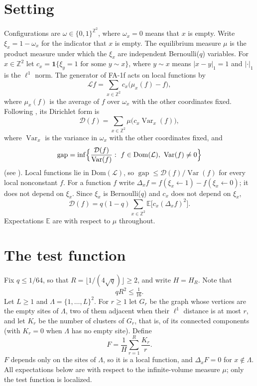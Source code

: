 \documentclass[11pt]{article}
\theoremstyle{remark}
\newcommand{\Z}{\mathbb Z}
\newcommand{\E}{\mathbb E}
\newcommand{\1}{\mathbf 1}
\DeclareMathOperator{\Var}{Var}
\DeclareMathOperator{\gap}{gap}
\begin{document}
\section{Setting}\label{sec:setting}

Configurations are $\omega\in\{0,1\}^{\Z^2}$, where $\omega_x=0$ means that $x$ is empty. Write $\xi_x=1-\omega_x$ for the indicator that $x$ is empty. The equilibrium measure $\mu$ is the product measure under which the $\xi_x$ are independent Bernoulli($q$) variables. For $x\in\Z^2$ let $c_x=\1\{\xi_y=1\text{ for some }y\sim x\}$, where $y\sim x$ means $|x-y|_1=1$ and $|\cdot|_1$ is the $\ell^1$ norm. The generator of FA-1f acts on local functions by
\[
\mathcal Lf=\sum_{x\in\Z^2}c_x\bigl(\mu_x(f)-f\bigr),
\]
where $\mu_x(f)$ is the average of $f$ over $\omega_x$ with the other coordinates fixed. Following \cite{CMRT,HT}, its Dirichlet form is
\[
\mathcal D(f)=\sum_{x\in\Z^2}\mu\bigl(c_x\Var_x(f)\bigr),
\]
where $\Var_x$ is the variance in $\omega_x$ with the other coordinates fixed, and
\[
\gap=\inf\Bigl\{\frac{\mathcal D(f)}{\Var(f)}:\ f\in\mathrm{Dom}(\mathcal L),\ \Var(f)\ne0\Bigr\}
\]
(see \cite[(2.8)]{CMRT}). Local functions lie in $\mathrm{Dom}(\mathcal L)$, so $\gap\le\mathcal D(f)/\Var(f)$ for every local nonconstant $f$.
For a function $f$ write $\Delta_xf=f(\xi_x\leftarrow1)-f(\xi_x\leftarrow0)$; it does not depend on $\xi_x$. Since $\xi_x$ is Bernoulli($q$) and $c_x$ does not depend on $\xi_x$,
\begin{equation}\label{eq:dirichlet}
\mathcal D(f)=q(1-q)\sum_{x\in\Z^2}\E\bigl[c_x(\Delta_xf)^2\bigr].
\end{equation}
Expectations $\E$ are with respect to $\mu$ throughout.

\section{The test function}

Fix $q\le1/64$, so that $R=\lfloor1/(4\sqrt q)\rfloor\ge2$, and write $H=H_R$. Note that
\begin{equation}\label{eq:qR}
qR^2\le\tfrac1{16}.
\end{equation}
Let $L\ge1$ and $\Lambda=\{1,\dots,L\}^2$. For $r\ge1$ let $G_r$ be the graph whose vertices are the empty sites of $\Lambda$, two of them adjacent when their $\ell^1$ distance is at most $r$, and let $K_r$ be the number of clusters of $G_r$, that is, of its connected components (with $K_r=0$ when $\Lambda$ has no empty site). Define
\[
F=\frac1H\sum_{r=1}^R\frac{K_r}{r}.
\]
$F$ depends only on the sites of $\Lambda$, so it is a local function, and $\Delta_xF=0$ for $x\notin\Lambda$. All expectations below are with respect to the infinite-volume measure $\mu$; only the test function is localized.
\end{document}
